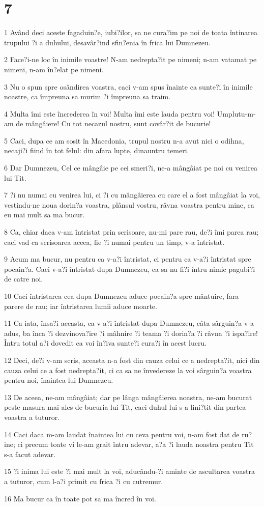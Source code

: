 \chapter{7}

\par 1 Având deci aceste fagaduin?e, iubi?ilor, sa ne cura?im pe noi de toata întinarea trupului ?i a duhului, desavâr?ind sfin?enia în frica lui Dumnezeu.
\par 2 Face?i-ne loc în inimile voastre! N-am nedrepta?it pe nimeni; n-am vatamat pe nimeni, n-am în?elat pe nimeni.
\par 3 Nu o spun spre osândirea voastra, caci v-am spus înainte ca sunte?i în inimile noastre, ca împreuna sa murim ?i împreuna sa traim.
\par 4 Multa îmi este încrederea în voi! Multa îmi este lauda pentru voi! Umplutu-m-am de mângâiere! Cu tot necazul nostru, sunt covâr?it de bucurie!
\par 5 Caci, dupa ce am sosit în Macedonia, trupul nostru n-a avut nici o odihna, necaji?i fiind în tot felul: din afara lupte, dinauntru temeri.
\par 6 Dar Dumnezeu, Cel ce mângâie pe cei smeri?i, ne-a mângâiat pe noi cu venirea lui Tit.
\par 7 ?i nu numai cu venirea lui, ci ?i cu mângâierea cu care el a fost mângâiat la voi, vestindu-ne noua dorin?a voastra, plânsul vostru, râvna voastra pentru mine, ca eu mai mult sa ma bucur.
\par 8 Ca, chiar daca v-am întristat prin scrisoare, nu-mi pare rau, de?i îmi parea rau; caci vad ca scrisoarea aceea, fie ?i numai pentru un timp, v-a întristat.
\par 9 Acum ma bucur, nu pentru ca v-a?i întristat, ci pentru ca v-a?i întristat spre pocain?a. Caci v-a?i întristat dupa Dumnezeu, ca sa nu fi?i întru nimic pagubi?i de catre noi.
\par 10 Caci întristarea cea dupa Dumnezeu aduce pocain?a spre mântuire, fara parere de rau; iar întristarea lumii aduce moarte.
\par 11 Ca iata, însa?i aceasta, ca v-a?i întristat dupa Dumnezeu, câta sârguin?a v-a adus, ba înca ?i dezvinova?ire ?i mâhnire ?i teama ?i dorin?a ?i râvna ?i ispa?ire! Întru totul a?i dovedit ca voi în?iva sunte?i cura?i în acest lucru.
\par 12 Deci, de?i v-am scris, aceasta n-a fost din cauza celui ce a nedrepta?it, nici din cauza celui ce a fost nedrepta?it, ci ca sa ne învedereze la voi sârguin?a voastra pentru noi, înaintea lui Dumnezeu.
\par 13 De aceea, ne-am mângâiat; dar pe lânga mângâierea noastra, ne-am bucurat peste masura mai ales de bucuria lui Tit, caci duhul lui s-a lini?tit din partea voastra a tuturor.
\par 14 Caci daca m-am laudat înaintea lui cu ceva pentru voi, n-am fost dat de ru?ine; ci precum toate vi le-am grait întru adevar, a?a ?i lauda noastra pentru Tit s-a facut adevar.
\par 15 ?i inima lui este ?i mai mult la voi, aducându-?i aminte de ascultarea voastra a tuturor, cum l-a?i primit cu frica ?i cu cutremur.
\par 16 Ma bucur ca în toate pot sa ma încred în voi.

